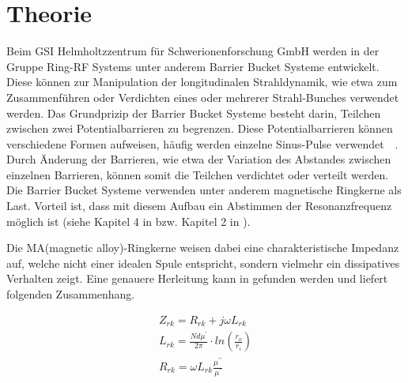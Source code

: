\section{Theorie}
Beim GSI Helmholtzzentrum für Schwerionenforschung GmbH werden in der Gruppe Ring-RF Systems unter anderem  Barrier Bucket Systeme entwickelt. Diese können zur Manipulation der longitudinalen Strahldynamik, wie etwa zum Zusammenf\"uhren oder Verdichten eines oder mehrerer Strahl-Bunches verwendet werden. 
Das Grundprizip der Barrier Bucket Systeme besteht darin, Teilchen zwischen zwei Potentialbarrieren zu begrenzen. Diese Potentialbarrieren k\"onnen verschiedene Formen aufweisen, h\"aufig werden einzelne Sinus-Pulse verwendet~\citep{harzheim2016modeling}~\citep{lee1997particle}. Durch \"Anderung der Barrieren, wie etwa der Variation des Abstandes zwischen einzelnen Barrieren, k\"onnen somit die Teilchen verdichtet oder verteilt werden.
Die Barrier Bucket Systeme verwenden unter anderem magnetische Ringkerne als Last. Vorteil ist, dass mit diesem Aufbau ein Abstimmen der Resonanzfrequenz m\"oglich ist (siehe Kapitel 4 in \citep{Klingbeil2015} bzw. Kapitel 2 in \citep{bast2017ba}).
\par
Die MA(magnetic alloy)-Ringkerne weisen dabei eine charakteristische Impedanz auf, welche nicht einer idealen Spule entspricht, sondern vielmehr ein dissipatives Verhalten zeigt. Eine genauere Herleitung kann in \citep{Klingbeil2015} gefunden werden und liefert folgenden Zusammenhang. 


\begin{align}
Z_{rk} = R_{rk} + j\omega L_{rk}\label{eq_01}\\
L_{rk} = \frac{Nd\mu^\prime}{2\pi}\cdot ln(\frac{r_o}{r_i})\label{eq_02}\\
R_{rk} = \omega L_{rk} \frac{\mu^{\prime\prime}}{\mu^{\prime}}\label{eq_03}
\end{align}



